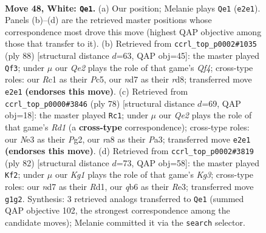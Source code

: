 \documentclass[11pt]{article}
\begin{document}
\clearpage

\begin{figure}[p]\centering
\begin{subfigure}{0.46\textwidth}\centering
\resizebox{\linewidth}{!}{%
\newchessgame
\chessboard[
  setfen={r6k/3n4/1q6/1P1p3p/p6r/P3N3/R3Q3/2R3K1 w - - 2 48},
  showmover=false,
  pgfstyle=straightmove, color=movearrow, markmove={e2-e1}
]}
\caption{}
\end{subfigure}\hfill
\begin{subfigure}{0.46\textwidth}\centering
\resizebox{\linewidth}{!}{%
\newchessgame
\chessboard[
  setfen={q2r2k1/5pr1/4p3/2P1P3/N4Q2/1P6/K4R2/8 w - - 2 45},
  showmover=false,
  pgfstyle=straightmove, color=movearrow, markmove={f4-f3}
]}
\caption{}
\end{subfigure}
\\[4pt]
\begin{subfigure}{0.46\textwidth}\centering
\resizebox{\linewidth}{!}{%
\newchessgame
\chessboard[
  setfen={5rk1/7p/2q1r3/Q3p3/3p4/P7/1P4P1/K2R3R w - - 5 40},
  showmover=false,
  pgfstyle=straightmove, color=movearrow, markmove={d1-c1}
]}
\caption{}
\end{subfigure}\hfill
\begin{subfigure}{0.46\textwidth}\centering
\resizebox{\linewidth}{!}{%
\newchessgame
\chessboard[
  setfen={1r4k1/5n2/p3r1p1/P2N4/1P2p3/2p1R1K1/2P5/3R4 w - - 2 42},
  showmover=false,
  pgfstyle=straightmove, color=movearrow, markmove={g3-f2}
]}
\caption{}
\end{subfigure}
\caption{\textbf{Move 48, White: \texttt{Qe1}.} (a) Our position; Melanie plays \texttt{Qe1} (\texttt{e2e1}). Panels (b)--(d) are the retrieved master positions whose correspondence most drove this move (highest QAP objective among those that transfer to it). (b) Retrieved from \texttt{ccrl\_top\_p0002\#1035} (ply 88) [structural distance $d$=63, QAP obj=45]: the master played \texttt{Qf3}; under $\mu$ our \emph{Qe2} plays the role of that game's \emph{Qf4}; cross-type roles: our \emph{R}c1 as their \emph{P}c5, our \emph{n}d7 as their \emph{r}d8; transferred move \texttt{e2e1} \textbf{(endorses this move)}. (c) Retrieved from \texttt{ccrl\_top\_p0000\#3846} (ply 78) [structural distance $d$=69, QAP obj=18]: the master played \texttt{Rc1}; under $\mu$ our \emph{Qe2} plays the role of that game's \emph{Rd1} (a \textbf{cross-type} correspondence); cross-type roles: our \emph{N}e3 as their \emph{P}g2, our \emph{r}a8 as their \emph{P}a3; transferred move \texttt{e2e1} \textbf{(endorses this move)}. (d) Retrieved from \texttt{ccrl\_top\_p0002\#3819} (ply 82) [structural distance $d$=73, QAP obj=58]: the master played \texttt{Kf2}; under $\mu$ our \emph{Kg1} plays the role of that game's \emph{Kg3}; cross-type roles: our \emph{n}d7 as their \emph{R}d1, our \emph{q}b6 as their \emph{R}e3; transferred move \texttt{g1g2}. Synthesis: 3 retrieved analogs transferred to \texttt{Qe1} (summed QAP objective 102, the strongest correspondence among the candidate moves); Melanie committed it via the \texttt{search} selector.}
\label{fig:thought-m94}
\end{figure}
\end{document}
